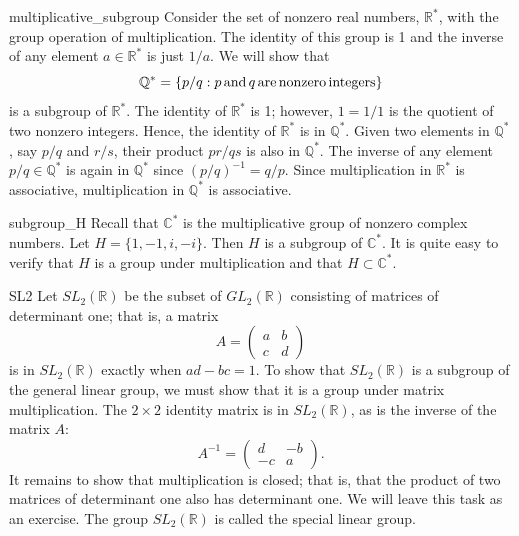  
\begin{example}{multiplicative_subgroup}
Consider the set of nonzero real numbers, ${\mathbb
R}^*$, with the group operation of multiplication.
The identity of this group is 1 and the inverse of any element $a \in
{\mathbb R}^*$ is just $1/a$. We will  show  that
\[
{\mathbb Q}^*\label{noteQstar} = \{ p/q : p \, {\rm
and }\, q\, {\rm are\, nonzero\, integers} \}
\]
is a subgroup of ${\mathbb R}^*$. The identity of ${\mathbb R}^*$ is 1;
however,  $1 = 1/1$ is the quotient of two nonzero integers. Hence,
the identity of ${\mathbb R}^*$ is in ${\mathbb Q}^*$. Given two elements in
${\mathbb Q}^*$, say $p/q$ and $r/s$, their product $pr/qs$ is also in
${\mathbb Q}^*$. The inverse of any element $p/q \in {\mathbb Q}^*$ is again
in ${\mathbb Q}^*$ since $(p/q)^{-1} = q/p$. Since multiplication in
${\mathbb R}^*$ is associative, multiplication in ${\mathbb Q}^*$ is
associative. 
\end{example}
 
 
\begin{example}{subgroup_H}
Recall that ${\mathbb C}^{\ast}$  is the multiplicative group of nonzero
complex numbers. Let $H = \{ 1, -1, i, -i \}$. Then $H$ is a subgroup
of ${\mathbb C}^{\ast}$. It is quite easy to verify  that $H$ is a group
under multiplication and that $H \subset {\mathbb C}^{\ast}$. 
\end{example}
 
 
\begin{example}{SL2}
Let $SL_2( {\mathbb R})$ be the subset of $GL_2( {\mathbb R })$
consisting of matrices of determinant one; that is, a matrix
\[
A =
\begin{pmatrix}
a & b \\
c & d
\end{pmatrix}
\]
is in $SL_2( {\mathbb R})$ exactly when $ad - bc = 1$. To show that
$SL_2( {\mathbb R})$ is a subgroup of the general linear group, we must
show that it is a group under matrix multiplication.  The $2 \times 2$
identity matrix is in $SL_2( {\mathbb R})$, as is the inverse of the
matrix $A$:  
\[
A^{-1} =
\begin{pmatrix}
d  & -b \\
-c &  a
\end{pmatrix}.
\]
It remains to show that multiplication is closed; that is, that the
product of two matrices of determinant one also has determinant one.
We will leave this task as an exercise. The group $SL_2({\mathbb R})$ is
called the {\bfi special linear group}.
\end{example}
 
